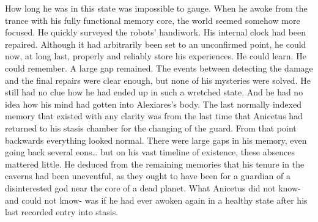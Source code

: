\documentclass[a4paper]{article}
\begin{document}
How long he was in this state was impossible to gauge. When he awoke from the trance with his fully functional memory core, the world seemed somehow more focused. He quickly surveyed the robots’ handiwork.
His internal clock had been repaired. Although it had arbitrarily been set to an unconfirmed point, he could now, at long last, properly and reliably store his experiences. He could learn. He could remember.
A large gap remained. The events between detecting the damage and the final repairs were clear enough, but none of his mysteries were solved. He still had no clue how he had ended up in such a wretched state. And he had no idea how his mind had gotten into Alexiares’s body.
The last normally indexed memory that existed with any clarity was from the last time that Anicetus had returned to his stasis chamber for the changing of the guard. From that point backwards everything looked normal. There were large gaps in his memory, even going back several eons… but on his vast timeline of existence, these absences mattered little. He deduced from the remaining memories that his tenure in the caverns had been uneventful, as they ought to have been for a guardian of a disinterested god near the core of a dead planet. What Anicetus did not know- and could not know- was if he had ever awoken again in a healthy state after his last recorded entry into stasis.
\end{document}
